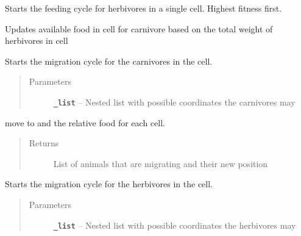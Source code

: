 \documentclass[a4paper,10pt,openany,oneside]{sphinxmanual}
\begin{document}
\begin{fulllineitems}

\begin{fulllineitems}
\label{landscape:biosim.landscape.Landscape.feeding_cycle}
Starts the feeding cycle for herbivores in a single cell.
Highest fitness first.

\end{fulllineitems}


\begin{fulllineitems}
\label{landscape:biosim.landscape.Landscape.herbivore_weight}
Updates available food in cell for carnivore based on
the total weight of herbivores in cell

\end{fulllineitems}


\begin{fulllineitems}
\label{landscape:biosim.landscape.Landscape.migration_cycle_carn}
Starts the migration cycle for the carnivores in the cell.
\begin{quote}\begin{description}
\item[{Parameters}] \leavevmode
\textbf{\texttt{\_list}} -- Nested list with possible coordinates the carnivores may

\end{description}\end{quote}

move to and the relative food for each cell.
\begin{quote}\begin{description}
\item[{Returns}] \leavevmode
List of animals that are migrating and their new position

\end{description}\end{quote}

\end{fulllineitems}


\begin{fulllineitems}
\label{landscape:biosim.landscape.Landscape.migration_cycle_herb}
Starts the migration cycle for the herbivores in the cell.
\begin{quote}\begin{description}
\item[{Parameters}] \leavevmode
\textbf{\texttt{\_list}} -- Nested list with possible coordinates the herbivores may


\end{description}
\end{quote}
\end{fulllineitems}
\end{fulllineitems}
\end{document}
